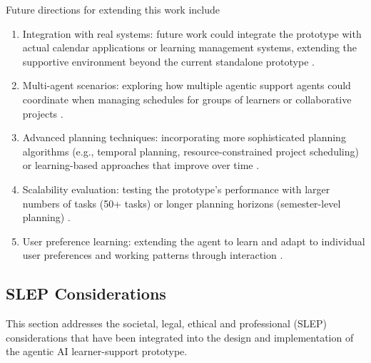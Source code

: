 \documentclass[12pt]{article}
\begin{document}
Future directions for extending this work include
\begin{enumerate}
    \item Integration with real systems: future work could integrate the prototype with actual calendar applications or learning management systems, extending the supportive environment beyond the current standalone prototype \parencite{koedinger2010data}.

    \item Multi-agent scenarios: exploring how multiple agentic support agents could coordinate when managing schedules for groups of learners or collaborative projects \parencite{autogen2023}.

    \item Advanced planning techniques: incorporating more sophisticated planning algorithms (e.g., temporal planning, resource-constrained project scheduling) or learning-based approaches that improve over time \parencite{ghallab2016automated}.

    \item Scalability evaluation: testing the prototype's performance with larger numbers of tasks (50+ tasks) or longer planning horizons (semester-level planning) \parencite{lee2025veriplan}.

    \item User preference learning: extending the agent to learn and adapt to individual user preferences and working patterns through interaction \parencite{wang2024survey}.
\end{enumerate}

\subsection{SLEP Considerations}

This section addresses the societal, legal, ethical and professional (SLEP) considerations that have been integrated into the design and implementation of the agentic AI learner-support prototype.
\end{document}
